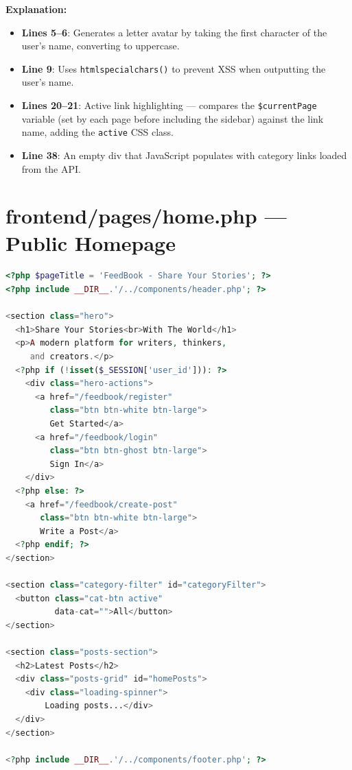 \documentclass[12pt,a4paper]{report}
\begin{document}
\textbf{Explanation:}
\begin{itemize}
    \item \textbf{Lines 5--6}: Generates a letter avatar by taking the first character of the user's name, converting to uppercase.
    \item \textbf{Line 9}: Uses \texttt{htmlspecialchars()} to prevent XSS when outputting the user's name.
    \item \textbf{Lines 20--21}: Active link highlighting --- compares the \texttt{\$currentPage} variable (set by each page before including the sidebar) against the link name, adding the \texttt{active} CSS class.
    \item \textbf{Line 38}: An empty div that JavaScript populates with category links loaded from the API.
\end{itemize}

\section{frontend/pages/home.php --- Public Homepage}

\begin{lstlisting}[language=PHP]
<?php $pageTitle = 'FeedBook - Share Your Stories'; ?>
<?php include __DIR__.'/../components/header.php'; ?>

<section class="hero">
  <h1>Share Your Stories<br>With The World</h1>
  <p>A modern platform for writers, thinkers,
     and creators.</p>
  <?php if (!isset($_SESSION['user_id'])): ?>
    <div class="hero-actions">
      <a href="/feedbook/register"
         class="btn btn-white btn-large">
         Get Started</a>
      <a href="/feedbook/login"
         class="btn btn-ghost btn-large">
         Sign In</a>
    </div>
  <?php else: ?>
    <a href="/feedbook/create-post"
       class="btn btn-white btn-large">
       Write a Post</a>
  <?php endif; ?>
</section>

<section class="category-filter" id="categoryFilter">
  <button class="cat-btn active"
          data-cat="">All</button>
</section>

<section class="posts-section">
  <h2>Latest Posts</h2>
  <div class="posts-grid" id="homePosts">
    <div class="loading-spinner">
        Loading posts...</div>
  </div>
</section>

<?php include __DIR__.'/../components/footer.php'; ?>
\end{lstlisting}
\end{document}
